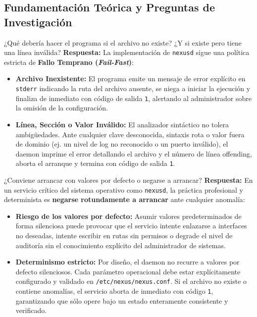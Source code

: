 \documentclass[10pt,a4paper]{article}
\begin{document}
\subsection{Fundamentación Teórica y Preguntas de Investigación}

\begin{pregunta}{¿Qué debería hacer el programa si el archivo no existe? ¿Y si existe pero tiene una línea inválida?}
    \textbf{Respuesta:} La implementación de \texttt{nexusd} sigue una política estricta de \textbf{Fallo Temprano (\textit{Fail-Fast})}:
    \begin{itemize}[leftmargin=*]
        \item \textbf{Archivo Inexistente:} El programa emite un mensaje de error explícito en \texttt{stderr} indicando la ruta del archivo ausente, se niega a iniciar la ejecución y finaliza de inmediato con código de salida \texttt{1}, alertando al administrador sobre la omisión de la configuración.
        \item \textbf{Línea, Sección o Valor Inválido:} El analizador sintáctico no tolera ambigüedades. Ante cualquier clave desconocida, sintaxis rota o valor fuera de dominio (ej. un nivel de log no reconocido o un puerto inválido), el daemon imprime el error detallando el archivo y el número de línea offending, aborta el arranque y termina con código de salida \texttt{1}.
    \end{itemize}
\end{pregunta}

\begin{pregunta}{¿Conviene arrancar con valores por defecto o negarse a arrancar?}
    \textbf{Respuesta:} En un servicio crítico del sistema operativo como \texttt{nexusd}, la práctica profesional y determinista es \textbf{negarse rotundamente a arrancar} ante cualquier anomalía:
    \begin{itemize}[leftmargin=*]
        \item \textbf{Riesgo de los valores por defecto:} Asumir valores predeterminados de forma silenciosa puede provocar que el servicio intente enlazarse a interfaces no deseadas, intente escribir en rutas sin permisos o degrade el nivel de auditoría sin el conocimiento explícito del administrador de sistemas.
        \item \textbf{Determinismo estricto:} Por diseño, el daemon no recurre a valores por defecto silenciosos. Cada parámetro operacional debe estar explícitamente configurado y validado en \texttt{/etc/nexus/nexus.conf}. Si el archivo no existe o contiene anomalías, el servicio aborta de inmediato con código \texttt{1}, garantizando que sólo opere bajo un estado enteramente consistente y verificado.
    \end{itemize}
\end{pregunta}
\end{document}
